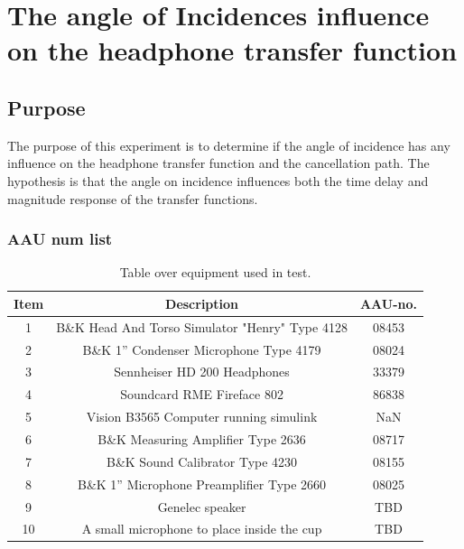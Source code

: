 
\section{The angle of Incidences influence on the headphone transfer function}

\subsection{Purpose}
The purpose of this experiment is to determine if the angle of incidence has any influence on the headphone transfer function and the cancellation path. The hypothesis is that the angle on incidence influences both the time delay and magnitude response of the transfer functions.

\subsubsection{AAU num list}
\begin{table}[H]
	\centering
	\begin{tabular}{ c c c } \toprule
		{Item}	& {Description} 						& {AAU-no}. \\ \bottomrule 
		1	&	B\&K Head And Torso Simulator "Henry" Type 4128	& 08453		\\
		2	&	B\&K 1'' Condenser Microphone Type 4179 	& 08024\\
		3	&	Sennheiser HD 200	Headphones				& 33379		\\
		4	&	Soundcard RME Fireface 802					& 86838		\\
		5	&	Vision B3565 Computer running simulink		& NaN		\\
		6	&	B\&K Measuring Amplifier Type 2636			& 08717		\\
		7	&	B\&K Sound Calibrator Type 4230				& 08155		\\ 
		8	&	B\&K 1'' Microphone Preamplifier Type 2660	& 08025		\\
		9	&	Genelec speaker								& TBD		\\ 
		10	&	A small microphone to place inside the cup	& TBD\\
		\bottomrule
	\end{tabular}
	\caption{Table over equipment used in test.}
	\label{tab:AngleOfIncideceHP}
\end{table}

